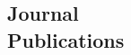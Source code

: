 \documentclass[margin,line]{resume}
\begin{document}
\begin{resume}

    \section{\mysidestyle Journal\\Publications}
      \begin{bibenum}
      \item {}
      \end{bibenum}



\end{resume}
\end{document}
